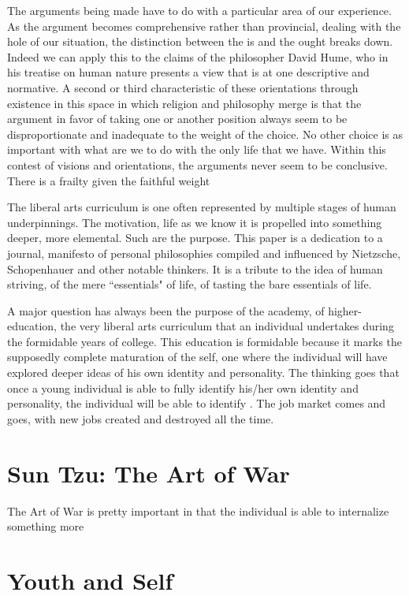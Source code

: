 \documentclass[12pt,letterpaper]{article}
\begin{document}
The arguments being made have to do with a particular area of our experience.  As the argument becomes comprehensive rather than provincial, dealing with the hole of our situation, the distinction between the is and the ought breaks down.  Indeed we can apply this to the claims of the philosopher David Hume, who in his treatise on human nature presents a view that is at one descriptive and normative.  A second or third characteristic of these orientations through existence in this space in which religion and philosophy merge is that the argument in favor of taking one or another position always seem to be disproportionate and inadequate to the weight  of the choice.  No other choice is as important with what are we to do with the only life that we have.  Within this contest of visions and orientations, the arguments never seem to be conclusive.  There is a frailty given the faithful weight 


The liberal arts curriculum is one often represented by multiple stages of human underpinnings.  The motivation, life as we know it is propelled into something deeper, more elemental.  Such are the purpose.  This paper is a dedication to a journal, manifesto of personal philosophies compiled and influenced by Nietzsche, Schopenhauer and other notable thinkers.  It is a tribute to the idea of human striving, of the mere ``essentials" of life, of tasting the bare essentials of life.

A major question has always been the purpose of the academy, of higher-education, the very liberal arts curriculum that an individual undertakes during the formidable years of college.  This education is formidable because it marks the supposedly complete maturation of the self, one where the individual will have explored deeper ideas of his own identity and personality.  The thinking goes that once a young individual is able to fully identify his/her own identity and personality, the individual will be able to identify .  The job market comes and goes, with new jobs created and destroyed all the time.

\section{Sun Tzu: The Art of War}
The Art of War is pretty important in that the individual is able to internalize something more 

\section{Youth and Self}
\end{document}
